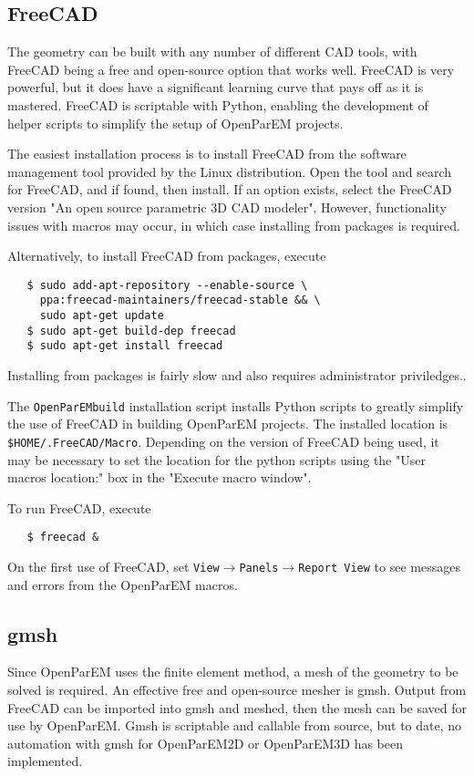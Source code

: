 \documentclass[titlepage]{article}
\renewcommand\_{\textunderscore\linebreak[1]}
\begin{document}
\subsection{FreeCAD}
\label{sec:freecad}

The geometry can be built with any number of different CAD tools, with FreeCAD \cite{freecad} being a free and open-source option that works well.  FreeCAD is very powerful, but it does have a significant learning curve that pays off as it is mastered.  FreeCAD is scriptable with Python, enabling the development of helper scripts to simplify the setup of OpenParEM projects.

The easiest installation process is to install FreeCAD from the software management tool provided by the Linux distribution.  Open the tool and search for FreeCAD, and if found, then install.  If an option exists, select the FreeCAD version "An open source parametric 3D CAD modeler".  However, functionality issues with macros may occur, in which case installing from packages is required.

Alternatively, to install FreeCAD from packages, execute
\begin{verbatim}
   $ sudo add-apt-repository --enable-source \
     ppa:freecad-maintainers/freecad-stable && \
     sudo apt-get update
   $ sudo apt-get build-dep freecad
   $ sudo apt-get install freecad
\end{verbatim}
Installing from packages is fairly slow and also requires administrator priviledges..

The \texttt{OpenParEM\_build} installation script installs Python scripts to greatly simplify the use of FreeCAD in building OpenParEM projects.  The installed location is \texttt{\$HOME/.FreeCAD/Macro}.  Depending on the version of FreeCAD being used, it may be necessary to set the location for the python scripts using the "User macros location:" box in the "Execute macro window".

To run FreeCAD, execute
\begin{verbatim}
   $ freecad &
\end{verbatim}
On the first use of FreeCAD, set \texttt{View}$\rightarrow$\texttt{Panels}$\rightarrow$\texttt{Report View} to see messages and errors from the OpenParEM macros.

\subsection{gmsh}

Since OpenParEM uses the finite element method, a mesh of the geometry to be solved is required. An effective free and open-source mesher is gmsh. Output from FreeCAD can be imported into gmsh and meshed, then the mesh can be saved for use by OpenParEM.  Gmsh is scriptable and callable from source, but to date, no automation with gmsh for OpenParEM2D or OpenParEM3D has been implemented.
\end{document}
